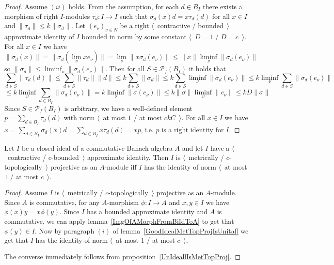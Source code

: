 \begin{proof}
Assume $(ii)$ holds. From the assumption, for each $d\in B_I$ there exists a
morphism of right $I$-modules $\tau_d:I\to I$ such that
$\sigma_d(x)d=x\tau_d(d)$ for all $x\in I$ and 
$\lVert\tau_d\rVert\leq k\lVert\sigma_d\rVert$. 
Let ${(e_\nu)}_{\nu\in N}$ be a right $\langle$~contractive / bounded~$\rangle$ 
approximate identity of $I$ bounded in norm by some constant 
$\langle$~$D=1$ / $D=c$~$\rangle$. For all $x\in I$ we have
\[
\lVert\sigma_d(x)\rVert
=\lVert\sigma_d(\lim_\nu x e_\nu)\rVert
=\lim_\nu\lVert x\sigma_d(e_\nu)\rVert
\leq\lVert x\rVert\liminf_\nu\lVert\sigma_d(e_\nu)\rVert
\]
so $\lVert\sigma_d\rVert\leq \liminf_\nu\lVert\sigma_d(e_\nu)\rVert$. 
Then for all $S\in\mathcal{P}_{f}(B_I)$ it holds that
\[
\sum_{d\in S}\lVert \tau_d(d)\rVert
\leq \sum_{d\in S}\lVert \tau_d\rVert\lVert d\rVert
\leq k\sum_{d\in S}\lVert \sigma_d\rVert
\leq k\sum_{d\in S}\liminf_\nu \lVert \sigma_d(e_\nu)\rVert
\leq k\liminf_{\nu}\sum_{d\in S}\lVert \sigma_d(e_\nu) \rVert
\]
\[
\leq k\liminf_{\nu}\sum_{d\in B_I}\lVert \sigma_d(e_\nu) \rVert
=k\liminf_{\nu}\lVert\sigma(e_\nu)\rVert
\leq k\lVert\sigma\rVert\liminf_{\nu}\lVert e_\nu\rVert
\leq kD\lVert\sigma\rVert
\]
Since $S\in \mathcal{P}_{f}(B_I)$ is arbitrary, we have a well-defined element
$p=\sum_{d\in B_I}\tau_d(d)$ with norm $\langle$~at most $1$ / at most
$ckC$~$\rangle$. For all $x\in I$ 
we have $x=\sum_{d\in B_I}\sigma_d(x)d=\sum_{d\in B_I}x\tau_d(d)=xp$, 
i.e. $p$ is a right identity for $I$.
\end{proof}

\begin{theorem}\label{GoodCommIdealMetTopProjIsUnital} Let $I$ be a closed ideal 
of a commutative Banach algebra $A$ and let $I$ have a $\langle$~contractive /
$c$-bounded~$\rangle$ approximate identity. Then $I$ is $\langle$~metrically /
$c$-topologically~$\rangle$ projective as an $A$-module iff $I$ has the identity of
norm $\langle$~at most $1$ / at most $c$~$\rangle$.
\end{theorem} 
\begin{proof} Assume $I$ is $\langle$~metrically / $c$-topologically~$\rangle$
projective as an $A$-module. Since $A$ is commutative, for any $A$-morphism
$\phi:I\to A$ and $x,y\in I$ we have $\phi(x)y=x\phi(y)$. Since $I$ has a 
bounded approximate identity and $A$ is commutative, we can apply
lemma~\ref{ImgOfAMorphFromBiIdToA} to get that $\phi(y)\in I$. Now by paragraph
$(i)$ of lemma~\ref{GoodIdealMetTopProjIsUnital} we get that $I$ has the
identity of norm $\langle$~at most $1$ / at most $c$~$\rangle$.

The converse immediately follows from proposition~\ref{UnIdeallIsMetTopProj}.
\end{proof}

